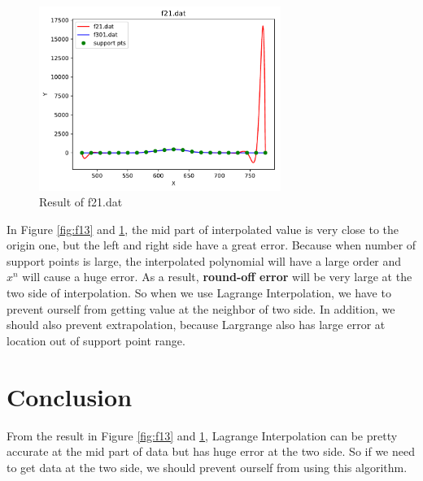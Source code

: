 \documentclass{article}
\begin{document}
\begin{figure}[H]
    \centering
    \includegraphics[width=0.7\textwidth]{src/f21.pdf}
    \caption{Result of f21.dat}
    \label{fig:f21}
\end{figure}
In Figure \ref{fig:f13} and \ref{fig:f21}, the mid part of interpolated value is very close to the origin one, but the left and 
right side  have a great error. Because when number of support points is large, the interpolated polynomial will have a large order 
and $x^n$ will cause a huge error. As a result, \textbf{round-off error} will be very large at the
two side of interpolation. So when we use Lagrange Interpolation, we have to prevent ourself from getting value at
the neighbor of two side. In addition, we should also prevent extrapolation, because Largrange also has large error at location 
out of support point range.

\section{Conclusion}
From the result in Figure \ref{fig:f13} and \ref{fig:f21}, Lagrange Interpolation can be pretty accurate at the mid part of
data but has huge error at the two side. So if we need to get data at the two side, we should prevent ourself from using
this algorithm.
\end{document}
